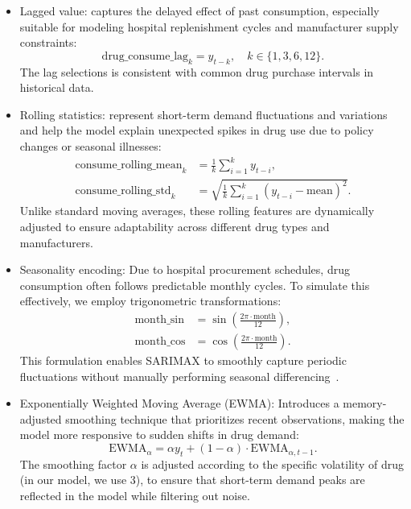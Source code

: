 \documentclass[12pt]{article}
\begin{document}
\begin{itemize}
    \item Lagged value: captures the delayed effect of past consumption, especially suitable for modeling hospital replenishment cycles and manufacturer supply constraints:
    \begin{equation}
    \text{drug\_consume\_lag}_{k} = y_{t-k}, \quad k \in \{1, 3, 6, 12\}.
    \end{equation}
    The lag selections is consistent with common drug purchase intervals in historical data.

    \item Rolling statistics: represent short-term demand fluctuations and variations and help the model explain unexpected spikes in drug use due to policy changes or seasonal illnesses:
    \begin{align}
    \text{consume\_rolling\_mean}_{k} &= \frac{1}{k} \sum_{i=1}^{k} y_{t-i}, \\
    \text{consume\_rolling\_std}_{k} &= \sqrt{\frac{1}{k} \sum_{i=1}^{k} (y_{t-i} - \text{mean})^2}.
    \end{align}
    Unlike standard moving averages, these rolling features are dynamically adjusted to ensure adaptability across different drug types and manufacturers.

    \item Seasonality encoding: Due to hospital procurement schedules, drug consumption often follows predictable monthly cycles. To simulate this effectively, we employ trigonometric transformations:
    \begin{align}
    \text{month\_sin} &= \sin\left(\frac{2\pi \cdot \text{month}}{12}\right), \\
    \text{month\_cos} &= \cos\left(\frac{2\pi \cdot \text{month}}{12}\right).
    \end{align}
    This formulation enables SARIMAX to smoothly capture periodic fluctuations without manually performing seasonal differencing~\cite{box2015}.

    \item Exponentially Weighted Moving Average (EWMA): Introduces a memory-adjusted smoothing technique that prioritizes recent observations, making the model more responsive to sudden shifts in drug demand:
    \begin{equation}
    \text{EWMA}_{\alpha} = \alpha y_{t} + (1-\alpha) \cdot \text{EWMA}_{\alpha,t-1}.
    \end{equation}
    The smoothing factor \(\alpha\) is adjusted according to the specific volatility of drug (in our model, we use 3), to ensure that short-term demand peaks are reflected in the model while filtering out noise.


\end{itemize}
\end{document}
